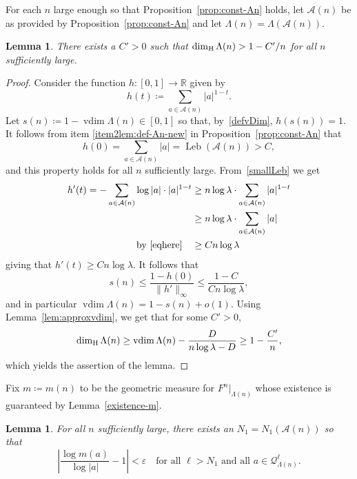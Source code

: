 \documentclass[english, 10pt]{amsart}
\numberwithin{equation}{section}
\theoremstyle{definition}
\theoremstyle{plain}
\newtheorem{lemma}[definition]{Lemma}
\theoremstyle{plain}
\theoremstyle{definition}
\theoremstyle{definition}
\theoremstyle{plain}
\theoremstyle{definition}
\newcommand{\vdim}{\operatorname{vdim}}
\newcommand{\Leb}{\operatorname{Leb}}
\newcommand{\eps}{\varepsilon}
\newcommand{\cA}{{\mathcal A}}
\newcommand{\cQ}{{\mathcal Q}}
\newcommand{\R}{{\mathbb R}}
\newcommand{\eqdef}{\coloneqq}
\numberwithin{equation}{section}
\begin{document}
For each $n$ large enough so that Proposition~\ref{prop:const-An} holds, let $\cA(n)$ be as provided by Proposition~\ref{prop:const-An} and let $\Lambda(n) = \Lambda( \cA(n) )$.

\begin{lemma}\label{lem:dim-An}
  There exists a $C'> 0$ such that $\dim_{\rm H} \Lambda (n)  > 1 - C'/n$ for all $n$ sufficiently large.
\end{lemma}

\begin{proof}
Consider the function $h \colon [0,1] \to \R$ given by
\[
    	h (t) \eqdef \sum_{ a \in \cA(n) } |a|^{ 1 - t }.
\]
Let $s(n) \eqdef 1 -  \vdim \Lambda(n) \in [0,1]$ so that, by~\eqref{defvDim}, $h ( s(n) ) = 1$. It follows from item \eqref{item2lem:def-An-new} in Proposition~\ref{prop:const-An} that
\begin{equation}\label{eqhere}
	h (0) = \sum_{ a \in \cA(n) } |a|
		= \Leb ( \cA(n) ) 
		> C,
\end{equation}
and this property holds for all $n$ sufficiently large. From~\eqref{smallLeb} we get
\begin{align*}
    	h ' (t) 
	= - \sum_{ a \in \cA(n) } \log |a| \cdot |a|^{ 1 - t }
    	&\ge n \log \lambda \cdot \sum_{ a \in \cA (n) } |a|^{ 1 - t } \\
    	&\ge n \log \lambda \cdot \sum_{ a \in \cA (n) } |a|\\
    	\text{by \eqref{eqhere}}\quad
	&\ge C n  \log \lambda
\end{align*}
  giving that $h'(t) \ge Cn \log \lambda$. It follows that
  \[
    s (n)\le \frac{ 1 - h (0) }{ \| h' \|_{ \infty } } \le \frac{ 1 - C }{ C n \log \lambda }
    ,
  \]
  and in particular $\vdim \Lambda (n) = 1 - s(n) +  o(1)$. Using Lemma~\ref{lem:approxvdim}, we get that for some $C' > 0$,
  \[
    \dim_{ \rm H } \Lambda (n)
    \ge \vdim \Lambda (n) - \frac{ D }{ n \log \lambda - D }
    \ge  1 - \frac{ C' }{ n },
  \]
  which yields the assertion of the lemma.
\end{proof}


Fix $m \coloneqq m(n)$ to be the geometric measure for $F^n|_{\Lambda(n)}$ whose existence is guaranteed by Lemma~\ref{existence-m}.

\begin{lemma}\label{lem:uni-geom-An}
  For all $n$ sufficiently large, there exists an $N_1 = N_1 (\cA(n))$ so that
  \[
    \left|
    \frac{ \log m (a) }{ \log |a| } - 1
    \right|
    < \eps
    \quad
    \text{for all $\ell > N_1$ and all $a\in \cQ_{\Lambda(n)}^\ell$}
    .
  \]
\end{lemma}
\end{document}
